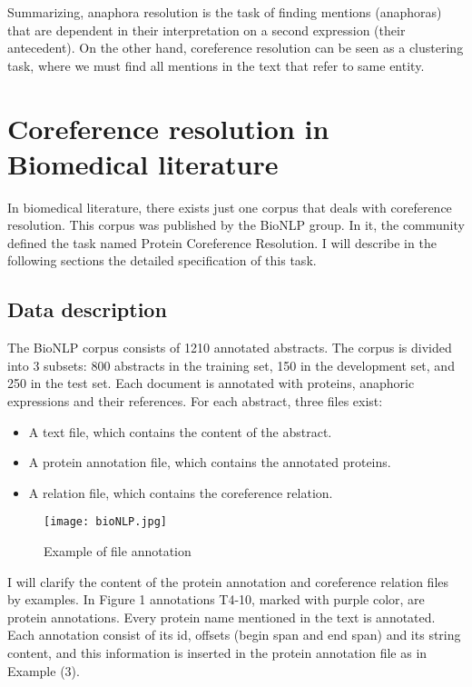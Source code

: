Summarizing, anaphora resolution is the task of finding mentions (anaphoras) that are dependent in their interpretation on a second expression (their antecedent). On the other hand, coreference resolution can be seen as a clustering task, where we must find all mentions in the text that refer to same entity.

\section{Coreference resolution in Biomedical literature}

In biomedical literature, there exists just one corpus that deals with coreference resolution. This corpus was published by the BioNLP group. In it, the community defined the task named Protein Coreference Resolution. I will describe in the following sections the detailed specification of this task.

\subsection{Data description}

The BioNLP corpus consists of 1210 annotated abstracts. The corpus is divided into 3 subsets: 800 abstracts in the training set, 150 in the development set, and 250 in the test set. Each document is annotated with proteins, anaphoric expressions and their references. For each abstract, three files exist:
\begin{itemize}
  \item A text file, which contains the content of the abstract.
  \item A protein annotation file, which contains the annotated proteins.
  \item A relation file, which contains the coreference relation.
\end{itemize}

\newpage
\begin{figure}[ht]
   \begin{center}
	  \texttt{[image: bioNLP.jpg]} 
      \caption[Example of file annotation]{Example of file annotation\footnotemark}
	  \label{Figure 2}
   \end{center}
\end{figure}

I will clarify the content of the protein annotation and coreference relation files by examples. In Figure 1 annotations T4-10, marked with purple color, are protein annotations. Every protein name mentioned in the text is annotated. Each annotation consist of its id, offsets (begin span and end span) and its string content, and this information is inserted in the protein annotation file as in Example (3).\\

